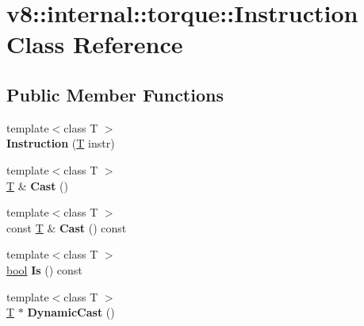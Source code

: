 \hypertarget{classv8_1_1internal_1_1torque_1_1Instruction}{}\section{v8\+:\+:internal\+:\+:torque\+:\+:Instruction Class Reference}
\label{classv8_1_1internal_1_1torque_1_1Instruction}
\subsection*{Public Member Functions}
\begin{DoxyCompactItemize}
\item 
\mbox{\label{classv8_1_1internal_1_1torque_1_1Instruction_a70a55fc566c3a5b8bc267c6dbe3958dd}} 
{\footnotesize template$<$class T $>$ }\\{\bfseries Instruction} (\mbox{\hyperlink{classv8_1_1internal_1_1torque_1_1T}{T}} instr)
\item 
\mbox{\label{classv8_1_1internal_1_1torque_1_1Instruction_a7dffae9d015e20f0fd2a9ba76af1bf7c}} 
{\footnotesize template$<$class T $>$ }\\\mbox{\hyperlink{classv8_1_1internal_1_1torque_1_1T}{T}} \& {\bfseries Cast} ()
\item 
\mbox{\label{classv8_1_1internal_1_1torque_1_1Instruction_ae86fab5f253598baf896aa9b539a86a3}} 
{\footnotesize template$<$class T $>$ }\\const \mbox{\hyperlink{classv8_1_1internal_1_1torque_1_1T}{T}} \& {\bfseries Cast} () const
\item 
\mbox{\label{classv8_1_1internal_1_1torque_1_1Instruction_a3c36c8f741c618fde00dfbcb8223e617}} 
{\footnotesize template$<$class T $>$ }\\\mbox{\hyperlink{classbool}{bool}} {\bfseries Is} () const
\item 
\mbox{\label{classv8_1_1internal_1_1torque_1_1Instruction_a9605bebdb720770a8f33719f108cd687}} 
{\footnotesize template$<$class T $>$ }\\\mbox{\hyperlink{classv8_1_1internal_1_1torque_1_1T}{T}} $\ast$ {\bfseries Dynamic\+Cast} ()

\end{DoxyCompactItemize}
